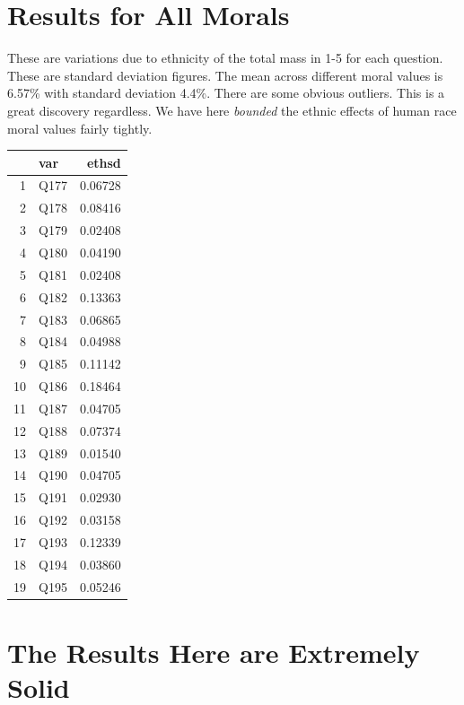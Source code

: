 \documentclass{amsart}
\begin{document}
\section{Results for All Morals}

These are variations due to ethnicity of the total mass in 1-5 for each question.  These are standard deviation figures.  The mean across different moral values is 6.57\% with standard deviation 4.4\%.  There are some obvious outliers.  This is a great discovery regardless.  We have here {\em bounded} the ethnic effects of human race moral values fairly tightly.

\begin{table}[ht]
\centering
\begin{tabular}{rlr}
  \hline
 & var & ethsd \\ 
  \hline
1 & Q177 & 0.06728 \\ 
  2 & Q178 & 0.08416 \\ 
  3 & Q179 & 0.02408 \\ 
  4 & Q180 & 0.04190 \\ 
  5 & Q181 & 0.02408 \\ 
  6 & Q182 & 0.13363 \\ 
  7 & Q183 & 0.06865 \\ 
  8 & Q184 & 0.04988 \\ 
  9 & Q185 & 0.11142 \\ 
  10 & Q186 & 0.18464 \\ 
  11 & Q187 & 0.04705 \\ 
  12 & Q188 & 0.07374 \\ 
  13 & Q189 & 0.01540 \\ 
  14 & Q190 & 0.04705 \\ 
  15 & Q191 & 0.02930 \\ 
  16 & Q192 & 0.03158 \\ 
  17 & Q193 & 0.12339 \\ 
  18 & Q194 & 0.03860 \\ 
  19 & Q195 & 0.05246 \\ 
   \hline
\end{tabular}
\end{table}



\section{The Results Here are Extremely Solid}
\end{document}
